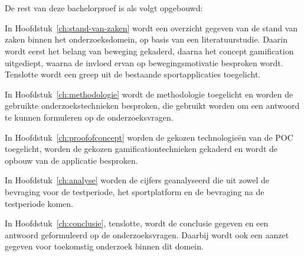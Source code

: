 
\section{}%
\label{sec:opzet-bachelorproef}

De rest van deze bachelorproef is als volgt opgebouwd:

In Hoofdstuk~\ref{ch:stand-van-zaken} wordt een overzicht gegeven van de stand van zaken binnen het onderzoeksdomein, op basis van een literatuurstudie. Daarin wordt eerst het belang van beweging gekaderd, daarna het concept gamification uitgediept, waarna de invloed ervan op bewegingsmotivatie besproken wordt. Tenslotte wordt een greep uit de bestaande sportapplicaties toegelicht.

In Hoofdstuk~\ref{ch:methodologie} wordt de methodologie toegelicht en worden de gebruikte onderzoekstechnieken besproken, die gebruikt worden om een antwoord te kunnen formuleren op de onderzoeksvragen.

In Hoofdstuk~\ref{ch:proofofconcept} worden de gekozen technologieën van de POC toegelicht, worden de gekozen gamificationtechnieken gekaderd en wordt de opbouw van de applicatie besproken.

In Hoofdstuk~\ref{ch:analyse} worden de cijfers geanalyseerd die uit zowel de bevraging voor de testperiode, het sportplatform en de bevraging na de testperiode komen.

In Hoofdstuk~\ref{ch:conclusie}, tenslotte, wordt de conclusie gegeven en een antwoord geformuleerd op de onderzoeksvragen. Daarbij wordt ook een aanzet gegeven voor toekomstig onderzoek binnen dit domein.